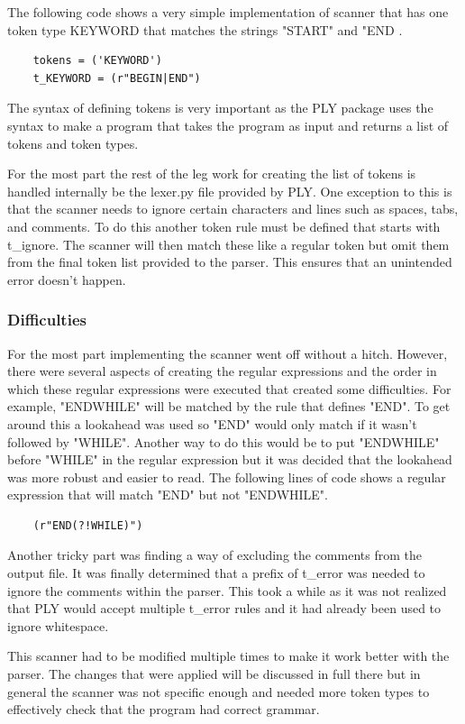 \documentclass[12pt, oneside]{article}   	%
\begin{document}
The following code shows a very simple implementation of scanner that has one token type KEYWORD that matches the strings "START" and "END .
\begin{lstlisting}
	tokens = ('KEYWORD')
	t_KEYWORD = (r"BEGIN|END")
\end{lstlisting}
The syntax of defining tokens is very important as the PLY package uses the syntax to make a program that takes the program as input and returns a list of tokens and token types.

For the most part the rest of the leg work for creating the list of tokens is handled internally be the lexer.py file provided by PLY. One exception to this is that the scanner needs to ignore certain characters and lines such as spaces, tabs, and comments. To do this another token rule must be defined that starts with t\_ignore. The scanner will then match these like a regular token but omit them from the final token list provided to the parser. This ensures that an unintended error doesn't happen.

\subsubsection{Difficulties}
For the most part implementing the scanner went off without a hitch. However, there were several aspects of creating the regular expressions and the order in which these regular expressions were executed that created some difficulties. For example, "ENDWHILE" will be matched by the rule 
that defines "END". To get around this a lookahead was used so "END" would only match if it wasn't followed by "WHILE". Another way to do this would be to put "ENDWHILE" before "WHILE" in the regular expression but it was decided that the lookahead was more robust and easier to read. The following lines of code  shows a regular expression that will match "END" but not "ENDWHILE".
\begin{lstlisting}
	(r"END(?!WHILE)")
\end{lstlisting}

Another tricky part was finding a way of excluding the comments from the output file. It was finally determined that a prefix of t\_error was needed to ignore the comments within the parser. This took a while as it was not realized that PLY would accept multiple t\_error rules and it had already been used to ignore whitespace.
 
This scanner had to be modified multiple times to make it work better with the parser. The changes that were applied
will be discussed in full there but in general the scanner was not specific enough and needed more token types to effectively check that the program had correct grammar.
		
\end{document}
